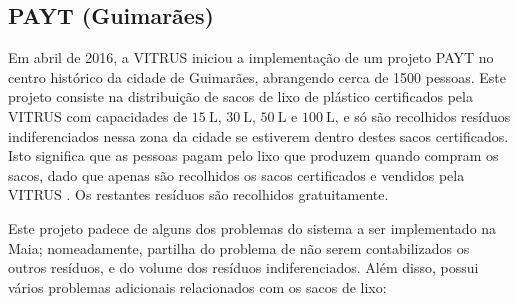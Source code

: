 \documentclass[11pt, a4paper, oneside]{book}
\begin{document}
\subsection{PAYT (Guimarães)}

Em abril de 2016, a VITRUS iniciou a implementação de um projeto PAYT no centro histórico da cidade de Guimarães, abrangendo cerca de 1500 pessoas. Este projeto consiste na distribuição de sacos de lixo de plástico certificados pela VITRUS com capacidades de $\SI{15}{\liter}$, $\SI{30}{\liter}$, $\SI{50}{\liter}$ e $\SI{100}{\liter}$, e só são recolhidos resíduos indiferenciados nessa zona da cidade se estiverem dentro destes sacos certificados. Isto significa que as pessoas pagam pelo lixo que produzem quando compram os sacos, dado que apenas são recolhidos os sacos certificados e vendidos pela VITRUS \cite{guimaraes-payt}. Os restantes resíduos são recolhidos gratuitamente.

Este projeto padece de alguns dos problemas do sistema a ser implementado na Maia; nomeadamente, partilha do problema de não serem contabilizados os outros resíduos, e do volume dos resíduos indiferenciados. Além disso, possui vários problemas adicionais relacionados com os sacos de lixo:
\end{document}
